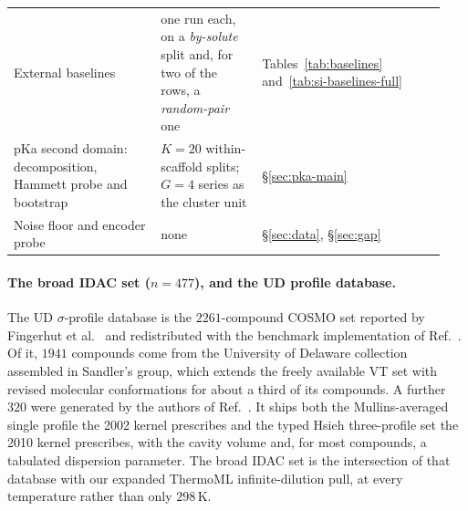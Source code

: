 \begin{table}[tp]
{\begin{tabular}{@{}L{0.32\linewidth}L{0.22\linewidth}L{0.40\linewidth}@{}}
External baselines & one run each, on a
\emph{by-solute} split and, for two of the rows, a \emph{random-pair} one &
Tables~\ref{tab:baselines} and~\ref{tab:si-baselines-full} \\
pKa second domain: decomposition, Hammett probe and bootstrap & $K{=}20$ within-scaffold splits; $G{=}4$ series as the cluster
unit & \S\ref{sec:pka-main} \\
Noise floor and encoder probe & none & \S\ref{sec:data},
\S\ref{sec:gap} \\
\bottomrule
\end{tabular}
}
\end{table}

\paragraph{The broad IDAC set ($n{=}477$), and the UD profile database.} The UD $\sigma$-profile database is the $2261$-compound COSMO set reported by Fingerhut
et al.~\cite{fingerhut2017} and redistributed with the benchmark implementation of
Ref.~\cite{bell2020cosmosac}. Of it, $1941$ compounds come
from the University of Delaware collection assembled in Sandler's group, which extends the freely
available VT set with revised molecular conformations for about a third of its compounds. A further
$320$ were generated by the authors of Ref.~\cite{fingerhut2017}. It ships both the Mullins-averaged single
profile the 2002 kernel prescribes and the typed Hsieh three-profile set the 2010 kernel prescribes,
with the cavity volume and, for most compounds, a tabulated dispersion parameter. The broad IDAC
set is the intersection of that database with our expanded ThermoML infinite-dilution pull, at every
temperature rather than only $298$\,K.

